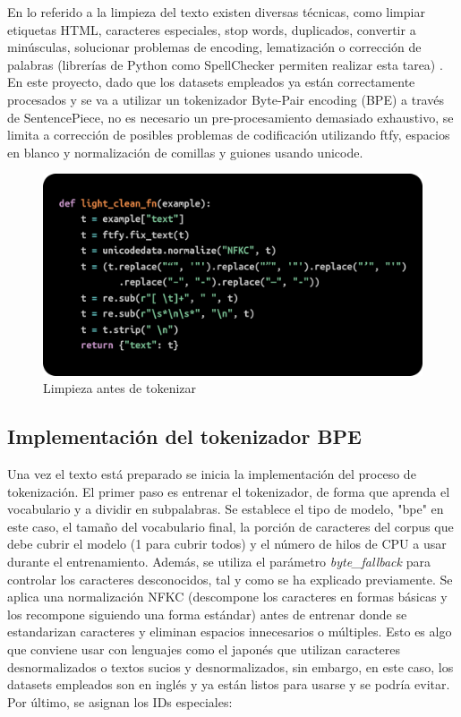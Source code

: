 \documentclass[11pt]{book}
\begin{document}
En lo referido a la limpieza del texto existen diversas técnicas, como limpiar etiquetas HTML, caracteres especiales, stop words, duplicados, convertir a minúsculas, solucionar problemas de encoding, lematización o corrección de palabras (librerías de Python como SpellChecker permiten realizar esta tarea) \parencite{shabbir2021cleaning}. En este proyecto, dado que los datasets empleados ya están correctamente procesados y se va a utilizar un tokenizador Byte-Pair encoding (BPE) a través de SentencePiece, no es necesario un pre-procesamiento demasiado exhaustivo, se limita a corrección de posibles problemas de codificación utilizando ftfy, espacios en blanco y normalización de comillas y guiones usando unicode.

\begin{figure}[h]
    \centering
    \includegraphics[width=0.5\linewidth]{img/preclean.png}
    \caption{Limpieza antes de tokenizar}
    \label{fig:placeholder2}
\end{figure}

\subsection{Implementación del tokenizador BPE}
Una vez el texto está preparado se inicia la implementación del proceso de tokenización. El primer paso es entrenar el tokenizador, de forma que aprenda el vocabulario y a dividir en subpalabras. Se establece el tipo de modelo, "bpe" en este caso, el tamaño del vocabulario final, la porción de caracteres del corpus que debe cubrir el modelo (1 para cubrir todos) y el número de hilos de CPU a usar durante el entrenamiento. Además, se utiliza el parámetro \textit{byte\_fallback} para controlar los caracteres desconocidos, tal y como se ha explicado previamente. Se aplica una normalización NFKC (descompone los caracteres en formas básicas y los recompone siguiendo una forma estándar) antes de entrenar donde se estandarizan caracteres y eliminan espacios innecesarios o múltiples. Esto es algo que conviene usar con lenguajes como el japonés que utilizan caracteres desnormalizados o textos sucios y desnormalizados, sin embargo, en este caso, los datasets empleados son en inglés y ya están listos para usarse y se podría evitar. Por último, se asignan los IDs especiales:
\end{document}
